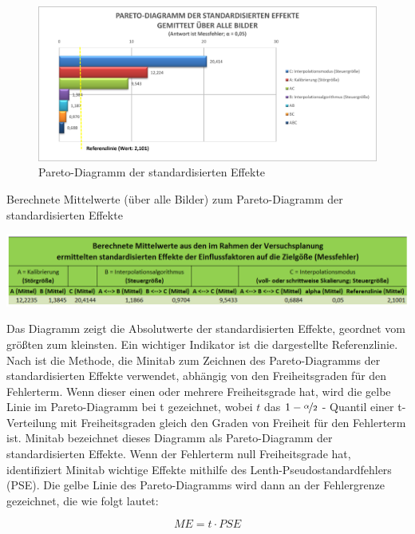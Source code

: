 \documentclass[
fontsize=10pt, 
listof = totoc,
parskip = half	
]{report}
\begin{document}
\begin{figure}[H]
	\centering
	\includegraphics[width=14cm, height=\textheight, keepaspectratio]{pics/DA_Pareto}
	\caption{Pareto-Diagramm der standardisierten Effekte}
	\label{fig:DAPareto}
\end{figure}

\begin{table}[H]
	\caption{Berechnete Mittelwerte (über alle Bilder) zum Pareto-Diagramm der standardisierten Effekte}
	\label{tab:DAPareto}
	\centering
	\includegraphics[width=\textwidth,height=\textheight,keepaspectratio]{pics/Tab_DA_Pareto}
\end{table}

\noindent Das Diagramm zeigt die Absolutwerte der standardisierten Effekte, geordnet vom größten zum kleinsten. Ein wichtiger Indikator ist die dargestellte Referenzlinie. Nach \cite{minitab_pareto} ist die Methode, die Minitab zum Zeichnen des Pareto-Diagramms der standardisierten Effekte verwendet, abhängig von den Freiheitsgraden für den Fehlerterm. Wenn dieser einen oder mehrere Freiheitsgrade hat, wird die gelbe Linie im Pareto-Diagramm bei t gezeichnet, wobei $t$ das $1-\nicefrac{\alpha}{2}$ - Quantil einer t-Verteilung mit Freiheitsgraden gleich den Graden von Freiheit für den Fehlerterm ist. Minitab bezeichnet dieses Diagramm als Pareto-Diagramm der standardisierten Effekte. Wenn der Fehlerterm null Freiheitsgrade hat, identifiziert Minitab wichtige Effekte mithilfe des Lenth-Pseudostandardfehlers (PSE). Die gelbe Linie des Pareto-Diagramms wird dann an der Fehlergrenze gezeichnet, die wie folgt lautet:

\begin{equation}
	ME = t\cdot PSE
\end{equation}
\end{document}
